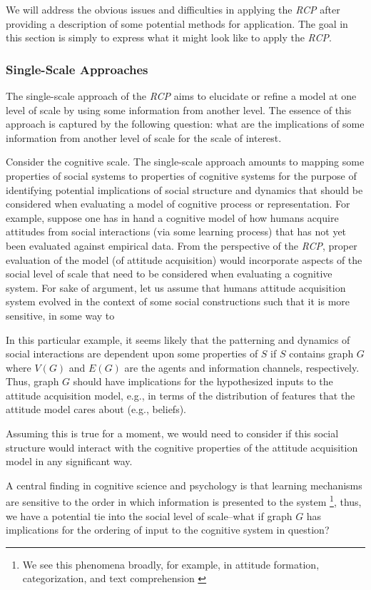 \documentclass{article}
\begin{document}
We will address the obvious issues and difficulties in applying the \textit{RCP} after providing a description of some potential methods for application.  The goal in this section is simply to express what it might look like to apply the \textit{RCP}.  

\subsubsection{Single-Scale Approaches}
The single-scale approach of the \textit{RCP} aims to elucidate or refine a model at one level of scale by using some information from another level.  The essence of this approach is captured by the following question: what are the implications of some information from another level of scale for the scale of interest. 
 
Consider the cognitive scale. The single-scale approach amounts to mapping some properties of social systems to properties of cognitive systems for the purpose of identifying potential implications of social structure and dynamics that should be considered when evaluating a model of cognitive process or representation.  For example, suppose one has in hand a cognitive model of how humans acquire attitudes from social interactions (via some learning process) that has not yet been evaluated against empirical data.  From the perspective of the \textit{RCP}, proper evaluation of the model (of attitude acquisition) would incorporate aspects of the social level of scale that need to be considered when evaluating a cognitive system.  For sake of argument, let us assume that humans attitude acquisition system evolved in the context of some social constructions such that it is more sensitive, in some way to 

In this particular example, it seems likely that the patterning and dynamics of social interactions are dependent upon some properties of $S$ if $S$ contains graph $G$ where $V(G)$ and $E(G)$ are the agents and information channels, respectively. Thus, graph $G$ should have implications for the hypothesized inputs to the attitude acquisition model, e.g., in terms of the distribution of features that the attitude model cares about (e.g., beliefs).  

Assuming this is true for a moment, we would need to consider if this social structure would interact with the cognitive properties of the attitude acquisition model in any significant way. 

A central finding in cognitive science and psychology is that learning mechanisms are sensitive to the order in which information is presented to the system \footnote{We see this phenomena broadly, for example,  in attitude formation\cite{cacioppo1992rudimentary}, categorization\cite{heit1994models}, and text comprehension \cite{mcnamara1996learning}}, thus, we have a potential tie into the social level of scale--what if graph $G$ has implications for the ordering of input to the cognitive system in question?  
\end{document}
